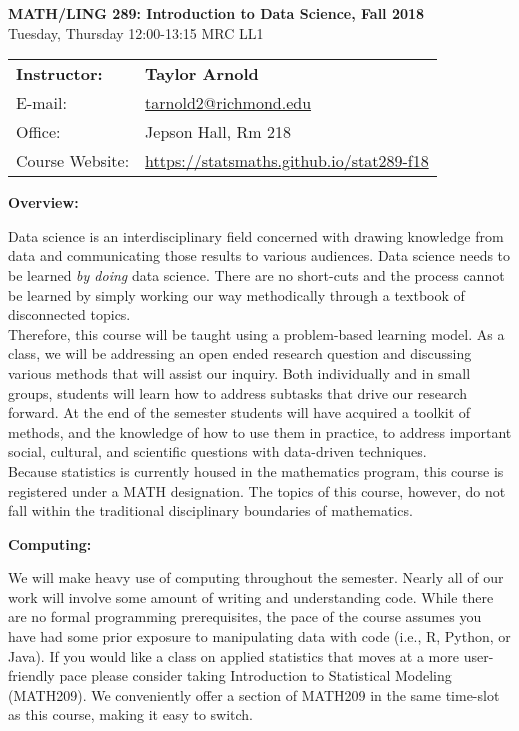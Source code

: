 \documentclass[12pt]{article}
\begin{document}
\begin{center}
{\bf MATH/LING 289: Introduction to Data Science, Fall 2018} \\
Tuesday, Thursday 12:00-13:15 \quad MRC LL1\\
\end{center}

\bigskip

\noindent
\begin{tabular}{ l l }
{\bf Instructor:} &  {\bf Taylor Arnold} \\
E-mail: & \href{mailto:tarnold2@richmond.edu}{tarnold2@richmond.edu} \\
Office: & Jepson Hall, Rm 218 \\
Course Website: & \url{https://statsmaths.github.io/stat289-f18}
\end{tabular}

\vspace{0.5cm}

\textbf{Overview:} \vspace{6pt}

Data science is an interdisciplinary field concerned with drawing knowledge
from data and communicating those results to various audiences. Data
science needs to be learned \textit{by doing} data science. There are
no short-cuts and the process cannot be learned by simply working our way
methodically through a textbook of disconnected topics.\\

Therefore, this course will be taught using a problem-based learning model. As
a class, we will be addressing an open ended research question and discussing
various methods that will assist our inquiry. Both individually and in small
groups, students will learn how to address subtasks that drive
our research forward. At the end of the semester students will have acquired
a toolkit of methods, and the knowledge of how to use them in practice, to
address important social, cultural, and scientific questions with data-driven
techniques.\\

Because statistics is currently housed in the mathematics program,
this course is registered under a MATH designation. The topics of this
course, however, do not fall within the traditional disciplinary boundaries
of mathematics.

\bigskip

\textbf{Computing:} \vspace{6pt}

We will make heavy use of computing throughout the semester. Nearly all of
our work will involve some amount of writing and understanding code. While
there are no formal programming prerequisites, the pace of the course
assumes you have had some prior exposure to manipulating data with code
(i.e., R, Python, or Java). If you would like a class on applied statistics
that moves at a more user-friendly pace please consider taking Introduction
to Statistical Modeling (MATH209). We conveniently offer a section of MATH209
in the same time-slot as this course, making it easy to switch.
\end{document}
